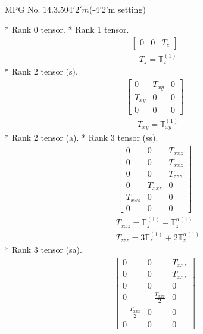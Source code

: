 \documentclass[fleqn,8pt,landscape]{jsarticle}
\begin{document}
\setcounter{MaxMatrixCols}{32}

\renewcommand{\tablename}{Table~}
\renewcommand{\figurename}{Figure~}
\begin{center}
\LARGE
MPG No. 14.3.50\quad$\bar{4}'2'm$\quad(-4'2'm setting)
\end{center}
* Rank 0 tensor.
* Rank 1 tensor.
\begin{align*}
\begin{bmatrix} 0 & 0 & T_{z} \end{bmatrix}
\end{align*}
\begin{align*}
& T_{z} = \mathbb{T}_{z}^{(1)}
\end{align*}
* Rank 2 tensor (s).
\begin{align*}
\begin{bmatrix} 0 & T_{xy} & 0 \\ T_{xy} & 0 & 0 \\ 0 & 0 & 0 \end{bmatrix}
\end{align*}
\begin{align*}
& T_{xy} = \mathbb{T}_{xy}^{(1)}
\end{align*}
* Rank 2 tensor (a).
* Rank 3 tensor (ss).
\begin{align*}
\begin{bmatrix} 0 & 0 & T_{xxz} \\ 0 & 0 & T_{xxz} \\ 0 & 0 & T_{zzz} \\ 0 & T_{xxz} & 0 \\ T_{xxz} & 0 & 0 \\ 0 & 0 & 0 \end{bmatrix}
\end{align*}
\begin{align*}
& T_{xxz} = \mathbb{T}_{z}^{(1)} - \mathbb{T}_{z}^{\alpha(1)} \\
& T_{zzz} = 3 \mathbb{T}_{z}^{(1)} + 2 \mathbb{T}_{z}^{\alpha(1)}
\end{align*}
* Rank 3 tensor (sa).
\begin{align*}
\begin{bmatrix} 0 & 0 & T_{xxz} \\ 0 & 0 & T_{xxz} \\ 0 & 0 & 0 \\ 0 & - \frac{T_{xxz}}{2} & 0 \\ - \frac{T_{xxz}}{2} & 0 & 0 \\ 0 & 0 & 0 \end{bmatrix}
\end{align*}
\end{document}
